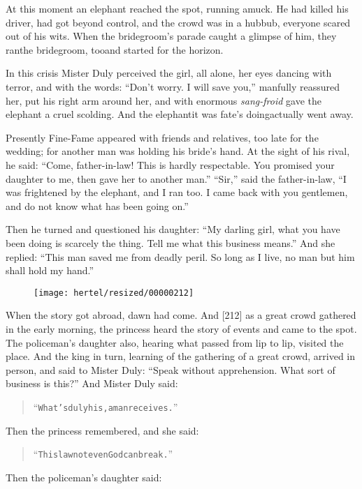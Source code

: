 \documentclass[article, twoside, 10pt]{memoir}
\renewenvironment{verbatim}{%
\begin{quote}%
\vskip -10pt%
\begin{alltt}\normalfont\small}{\end{alltt}%
\end{quote}%
\vskip -10pt
} %
\begin{document}
At this moment an elephant reached the spot, running amuck. He had
killed his driver, had got beyond control, and the crowd was in a
hubbub, everyone scared out of his wits. When the bridegroom's
parade caught a glimpse of him, they ran{\textemdash}the bridegroom,
too{\textemdash}and started for the horizon.

In this crisis Mister Duly perceived the girl, all alone, her eyes
dancing with terror, and with the words:
``Don't worry. I will save you,'' manfully reassured her, put his
right arm around her, and with enormous \emph{sang-froid} gave the
elephant a cruel scolding. And the elephant{\textemdash}it was fate's
doing{\textemdash}actually went away.

Presently Fine-Fame appeared with friends and relatives, too late
for the wedding; for another man was holding his bride's hand. At
the sight of his rival, he said:
``Come, father-in-law! This is hardly respectable. You promised your daughter to me, then gave her to another man.''
``Sir,'' said the father-in-law,
``I was frightened by the elephant, and I ran too. I came back with you gentlemen, and do not know what has been going on.''

Then he turned and questioned his daughter:
``My darling girl, what you have been doing is scarcely the thing. Tell me what this business means.''
And she replied:
``This man saved me from deadly peril. So long as I live, no man but him shall hold my hand.''

\begin{figure}[p]\texttt{[image: hertel/resized/00000212]}\end{figure}When the story got abroad, dawn had come. And [212] as a great
crowd gathered in the early morning, the princess heard the story
of events and came to the spot. The policeman's daughter also,
hearing what passed from lip to lip, visited the place. And the
king in turn, learning of the gathering of a great crowd, arrived
in person, and said to Mister Duly:
``Speak without apprehension. What sort of business is this?'' And
Mister Duly said:

\begin{verbatim}
“What's duly his, a man receives.”
\end{verbatim}
Then the princess remembered, and she said:

\begin{verbatim}
“This law not even God can break.”
\end{verbatim}
Then the policeman's daughter said:
\end{document}
